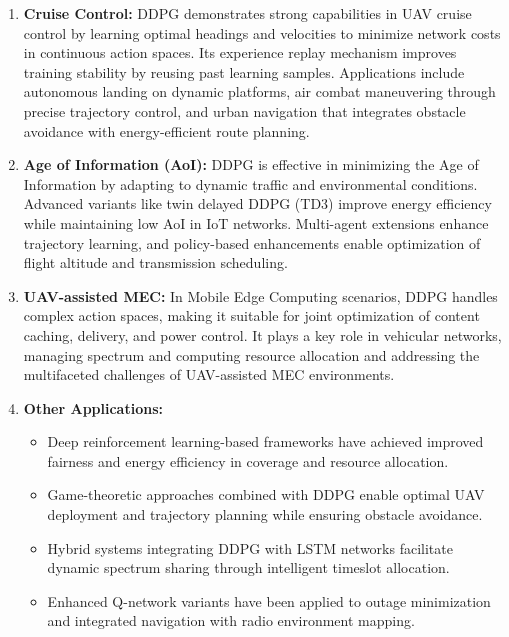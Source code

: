\begin{enumerate}

\item \textbf{Cruise Control:} DDPG demonstrates strong capabilities in UAV cruise control by learning optimal headings and velocities to minimize network costs in continuous action spaces. Its experience replay mechanism improves training stability by reusing past learning samples. Applications include autonomous landing on dynamic platforms, air combat maneuvering through precise trajectory control, and urban navigation that integrates obstacle avoidance with energy-efficient route planning.

\item \textbf{Age of Information (AoI):} DDPG is effective in minimizing the Age of Information by adapting to dynamic traffic and environmental conditions. Advanced variants like twin delayed DDPG (TD3) improve energy efficiency while maintaining low AoI in IoT networks. Multi-agent extensions enhance trajectory learning, and policy-based enhancements enable optimization of flight altitude and transmission scheduling.

\item \textbf{UAV-assisted MEC:} In Mobile Edge Computing scenarios, DDPG handles complex action spaces, making it suitable for joint optimization of content caching, delivery, and power control. It plays a key role in vehicular networks, managing spectrum and computing resource allocation and addressing the multifaceted challenges of UAV-assisted MEC environments.

\item \textbf{Other Applications:}
\begin{itemize}
    \item Deep reinforcement learning-based frameworks have achieved improved fairness and energy efficiency in coverage and resource allocation.
    \item Game-theoretic approaches combined with DDPG enable optimal UAV deployment and trajectory planning while ensuring obstacle avoidance.
    \item Hybrid systems integrating DDPG with LSTM networks facilitate dynamic spectrum sharing through intelligent timeslot allocation.
    \item Enhanced Q-network variants have been applied to outage minimization and integrated navigation with radio environment mapping.
\end{itemize}

\end{enumerate}





